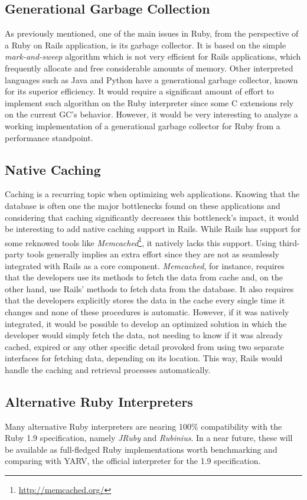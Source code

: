 \subsection{Generational Garbage Collection}
As previously mentioned, one of the main issues in Ruby, from the perspective of a Ruby on Rails application, is its garbage collector. It is based on the simple \textit{mark-and-sweep} algorithm which is not very efficient for Rails applications, which frequently allocate and free considerable amounts of memory. Other interpreted languages such as Java and Python have a generational garbage collector, known for its superior efficiency. It would require a significant amount of effort to implement such algorithm on the Ruby interpreter since some C extensions rely on the current GC's behavior. However, it would be very interesting to analyze a working implementation of a generational garbage collector for Ruby from a performance standpoint.

\subsection{Native Caching}
Caching is a recurring topic when optimizing web applications. Knowing that the database is often one the major bottlenecks found on these applications and considering that caching significantly decreases this bottleneck's impact, it would be interesting to add native caching support in Rails. While Rails has support for some reknowed tools like \textit{Memcached}\footnote{\url{http://memcached.org/}}, it natively lacks this support. Using third-party tools generally implies an extra effort since they are not as seamlessly integrated with Rails as a core component. \textit{Memcached}, for instance, requires that the developers use its methods to fetch the data from cache and, on the other hand, use Rails' methods to fetch data from the database. It also requires that the developers explicitly stores the data in the cache every single time it changes and none of these procedures is automatic. However, if it was natively integrated, it would be possible to develop an optimized solution in which the developer would simply fetch the data, not needing to know if it was already cached, expired or any other specific detail provoked from using two separate interfaces for fetching data, depending on its location. This way, Rails would handle the caching and retrieval processes automatically.

\subsection{Alternative Ruby Interpreters}
Many alternative Ruby interpreters are nearing 100\% compatibility with the Ruby 1.9 specification, namely \textit{JRuby} and \textit{Rubinius}. In a near future, these will be available as full-fledged Ruby implementations worth benchmarking and comparing with YARV, the official interpreter for the 1.9 specification.

